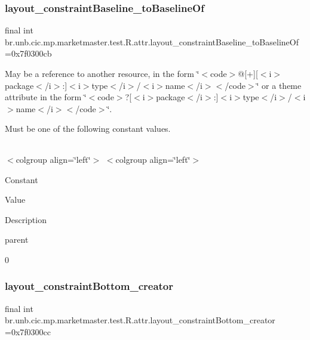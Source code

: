 \subsubsection{\texorpdfstring{layout\+\_\+constraint\+Baseline\+\_\+to\+Baseline\+Of}{layout\_constraintBaseline\_toBaselineOf}}
{\footnotesize\ttfamily final int br.\+unb.\+cic.\+mp.\+marketmaster.\+test.\+R.\+attr.\+layout\+\_\+constraint\+Baseline\+\_\+to\+Baseline\+Of =0x7f0300cb\hspace{0.3cm}{\ttfamily [static]}}

May be a reference to another resource, in the form \char`\"{}$<$code$>$@\mbox{[}+\mbox{]}\mbox{[}$<$i$>$package$<$/i$>$\+:\mbox{]}$<$i$>$type$<$/i$>$/$<$i$>$name$<$/i$>$$<$/code$>$\char`\"{} or a theme attribute in the form \char`\"{}$<$code$>$?\mbox{[}$<$i$>$package$<$/i$>$\+:\mbox{]}$<$i$>$type$<$/i$>$/$<$i$>$name$<$/i$>$$<$/code$>$\char`\"{}. 

Must be one of the following constant values.

\tabulinesep=1mm
\begin{longtabu} spread 0pt [c]{*{0}{|X[-1]}|}
\hline
\end{longtabu}
$<$colgroup align=\char`\"{}left\char`\"{}$>$ $<$colgroup align=\char`\"{}left\char`\"{}$>$ 

Constant

Value

Description 

parent

0\mbox{\label{classbr_1_1unb_1_1cic_1_1mp_1_1marketmaster_1_1test_1_1R_1_1attr_ae2deb4287b6247f76caebd98a1d6a971}} 
\subsubsection{\texorpdfstring{layout\+\_\+constraint\+Bottom\+\_\+creator}{layout\_constraintBottom\_creator}}
{\footnotesize\ttfamily final int br.\+unb.\+cic.\+mp.\+marketmaster.\+test.\+R.\+attr.\+layout\+\_\+constraint\+Bottom\+\_\+creator =0x7f0300cc\hspace{0.3cm}{\ttfamily [static]}}

